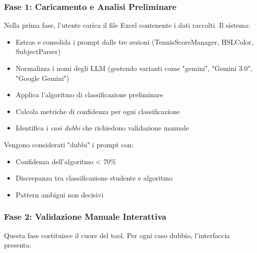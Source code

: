 \documentclass[a4paper,12pt]{article}
\begin{document}
\subsubsection{Fase 1: Caricamento e Analisi Preliminare}
Nella prima fase, l'utente carica il file Excel contenente i dati raccolti. Il sistema:
\begin{itemize}
    \item Estrae e consolida i prompt dalle tre sezioni (TennisScoreManager, HSLColor, SubjectParser)
    \item Normalizza i nomi degli LLM (gestendo varianti come "gemini", "Gemini 3.0", "Google Gemini")
    \item Applica l'algoritmo di classificazione preliminare
    \item Calcola metriche di confidenza per ogni classificazione
    \item Identifica i \textit{casi dubbi} che richiedono validazione manuale
\end{itemize}

Vengono considerati "dubbi" i prompt con:
\begin{itemize}
    \item Confidenza dell'algoritmo < 70\%
    \item Discrepanza tra classificazione studente e algoritmo
    \item Pattern ambigui non decisivi
\end{itemize}

\subsubsection{Fase 2: Validazione Manuale Interattiva}
Questa fase costituisce il cuore del tool. Per ogni caso dubbio, l'interfaccia presenta:
\end{document}
